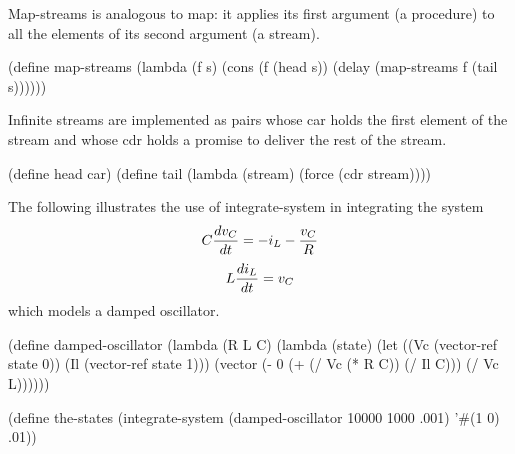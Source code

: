 {\cf Map-streams} is analogous to {\cf map}: it applies its first
argument (a procedure) to all the elements of its second argument (a
stream).

\begin{schemenoindent}
(define map-streams
  (lambda (f s)
    (cons (f (head s))
          (delay (map-streams f (tail s))))))%
\end{schemenoindent}

Infinite streams are implemented as pairs whose car holds the first
element of the stream and whose cdr holds a promise to deliver the rest
of the stream.

\begin{schemenoindent}
(define head car)
(define tail
  (lambda (stream) (force (cdr stream))))%
\end{schemenoindent}

\bigskip
The following illustrates the use of {\cf integrate-system} in
integrating the system
$$ C {dv_C \over dt} = -i_L - {v_C \over R}$$\nobreak
$$ L {di_L \over dt} = v_C$$
which models a damped oscillator.

\begin{schemenoindent}
(define damped-oscillator
  (lambda (R L C)
    (lambda (state)
      (let ((Vc (vector-ref state 0))
            (Il (vector-ref state 1)))
        (vector (- 0 (+ (/ Vc (* R C)) (/ Il C)))
                (/ Vc L))))))

(define the-states
  (integrate-system
     (damped-oscillator 10000 1000 .001)
     '\#(1 0)
     .01))%
\end{schemenoindent}





